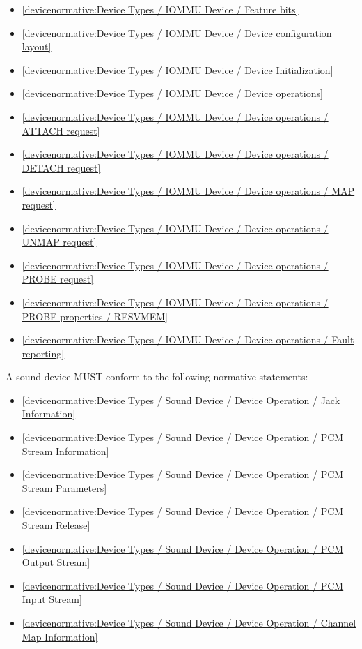\begin{itemize}
\item \ref{devicenormative:Device Types / IOMMU Device / Feature bits}
\item \ref{devicenormative:Device Types / IOMMU Device / Device configuration layout}
\item \ref{devicenormative:Device Types / IOMMU Device / Device Initialization}
\item \ref{devicenormative:Device Types / IOMMU Device / Device operations}
\item \ref{devicenormative:Device Types / IOMMU Device / Device operations / ATTACH request}
\item \ref{devicenormative:Device Types / IOMMU Device / Device operations / DETACH request}
\item \ref{devicenormative:Device Types / IOMMU Device / Device operations / MAP request}
\item \ref{devicenormative:Device Types / IOMMU Device / Device operations / UNMAP request}
\item \ref{devicenormative:Device Types / IOMMU Device / Device operations / PROBE request}
\item \ref{devicenormative:Device Types / IOMMU Device / Device operations / PROBE properties / RESVMEM}
\item \ref{devicenormative:Device Types / IOMMU Device / Device operations / Fault reporting}
\end{itemize}

\label{sec:Conformance / Device Conformance / Sound Device Conformance}

A sound device MUST conform to the following normative statements:

\begin{itemize}
\item \ref{devicenormative:Device Types / Sound Device / Device Operation / Jack Information}
\item \ref{devicenormative:Device Types / Sound Device / Device Operation / PCM Stream Information}
\item \ref{devicenormative:Device Types / Sound Device / Device Operation / PCM Stream Parameters}
\item \ref{devicenormative:Device Types / Sound Device / Device Operation / PCM Stream Release}
\item \ref{devicenormative:Device Types / Sound Device / Device Operation / PCM Output Stream}
\item \ref{devicenormative:Device Types / Sound Device / Device Operation / PCM Input Stream}
\item \ref{devicenormative:Device Types / Sound Device / Device Operation / Channel Map Information}
\end{itemize}

